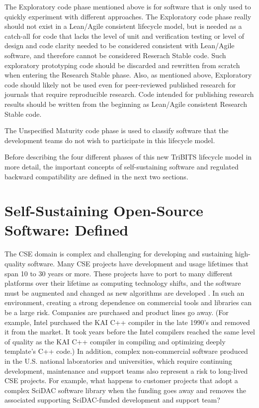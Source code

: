 \documentclass[11pt]{SANDreport}
\begin{document}
The Exploratory code phase mentioned above is for software that is
only used to quickly experiment with different approaches.  
The Exploratory code phase really should not
exist in a Lean/Agile consistent lifecycle model, but is needed as a
catch-all for code that lacks the level of unit and verification
testing or level of design and code clarity needed to be
considered consistent with Lean/Agile software, and therefore cannot be
considered Reserach Stable code.  Such exploratory prototyping code
should be discarded and rewritten from scratch when entering the
Research Stable phase.  Also, as mentioned above, Exploratory code
should likely not be used even for peer-reviewed published research
for journals that require reproducible research.  Code intended for
publishing research results should be written from the beginning
as Lean/Agile consistent Research Stable code.

The Unspecified Maturity code phase is used to classify software that the
development teams do not wish to participate in this lifecycle
model.

Before describing the four different phases of this new TriBITS
lifecycle model in more detail, the important concepts of
self-sustaining software and regulated backward compatibility
are defined in the next two sections.


%
{}\section{Self-Sustaining Open-Source Software: Defined}
\label{sec:self_sustaining_open_source_software}
%

The CSE domain is complex and challenging for developing
and sustaining high-quality software.  Many CSE projects have
development and usage lifetimes that span 10 to 30 years or more.
These projects have to port to many different platforms over their
lifetime as computing technology shifts, and the software must be
augmented and changed as new algorithms are developed
{}\cite{HPCNeedsAToolsStrategy05}.  In such an environment, creating a
strong dependence on commercial tools and libraries can be a large
risk.  Companies are purchased and product lines go away.  (For
example, Intel purchased the KAI C++ compiler in the late 1990's and
removed it from the market. It took years before the Intel compilers reached the
same level of quality as the KAI C++ compiler in compiling and
optimizing deeply template's C++ code.)  In addition, complex
non-commercial software produced in the U.S. national laboratories and
universities, which require continuing development, maintenance and
support teams also represent a risk to long-lived CSE projects.  For
example, what happens to customer projects that adopt a complex SciDAC
software library when the funding goes away and removes the
associated supporting SciDAC-funded development and support team?
\end{document}
